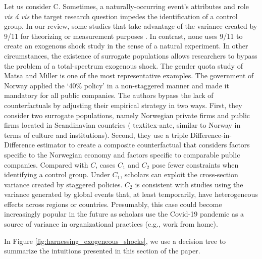 \documentclass[11pt]{article}
\begin{document}
\begin{refsection}
Let us consider C. Sometimes, a naturally-occurring event's attributes and role 
\textit{vis \'a vis} the target research question impedes the identification
of a control group. In our review, some studies that
take advantage of the variance created by 9/11 for theorizing
\autocite{corbo2016323} or measurement purposes \autocite{vergne20121027}. 
In contrast, none uses 9/11 to create an exogenous shock study in the sense 
of a natural experiment. In other circumstances, the existence of surrogate 
populations allows researchers to bypass the problem of a total-spectrum 
exogenous shock. The gender quota study of Matsa and Miller 
\autocite*{matsa_miller_2013} is one of the most representative examples. 
The government of Norway applied the `40\% policy' in a non-staggered manner 
and made it mandatory for all public companies. The authors bypass
the lack of counterfactuals by adjusting their empirical strategy 
in two ways. First, they consider two surrogate populations, namely Norwegian
private firms and public firms located in Scandinavian countries (
textit{ex-ante}, similar to Norway in terms of culture and institutions). Second, they use 
a triple Difference-in-Difference estimator to create a composite counterfactual
that considers factors specific to the Norwegian 
economy and factors specific to comparable public companies. Compared with $C$,
cases $C_{1}$ and $C_{2}$ pose fewer constraints when identifying a 
control group. Under $C_{1}$, scholars can exploit the cross-section  
variance created by staggered policies. $C_{2}$ is consistent with studies 
using the variance generated by global events that, at least temporarily,
have heterogeneous effects across regions or countries.
Presumably, this case could become increasingly popular in the future 
as scholars use the Covid-19 pandemic as a source of variance in 
organizational practices (e.g., work from home).

In Figure \ref{fig:harnessing_exogeneous_shocks}, we use a decision tree to 
summarize the intuitions presented in this section of the paper. 


\end{refsection}
\end{document}
